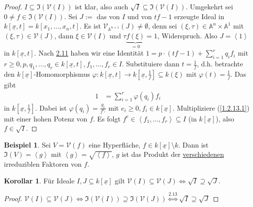\documentclass[
twoside=semi,
fontsize=12,
DIV=12, 
cleardoublepage=current,
leqno,
headings=optiontoheadandtoc, 
toc=idx
]{scrbook}
\newcommand{\A}{\mathbb{A}}
\newcommand{\V}{\mathcal{V}}
\newcommand{\x}{\underline{x}}
\newcommand{\I}{\mathfrak{I}}
\newcommand{\bracC}[1]{\left< #1 \right>}
\newcommand{\emphasize}[1]{\underline{#1}}
\theoremstyle{definition}
\newtheorem{beispiel}[definition]{Beispiel}
\newtheorem{korollar}[definition]{Korollar}
\begin{document}
	\begin{proof}
		$I \subseteq \I(\V(I))$ ist klar, also auch $\sqrt{I} \subseteq \I(\V(I))$. Umgekehrt sei $0 \neq f \in \I(\V(I))$. Sei $J:= $ das von $I$ und von $tf-1$ erzeugte Ideal in $k[\x, t] = k[x_1, \dots, x_n, t]$. Es ist $\V_{\A^{n+1}}(J) \neq \emptyset$, denn sei $(\xi, \tau) \in \A^n\times \A^1$ mit $(\xi, \tau) \in \V(J)$, dann $\xi \in \V(I)$ und $\tau \underbrace{f(\xi)}_{=0} = 1$, Widerspruch. Also $J =\bracC{1}$ in $k[\x, t]$. 
		\newline 
		Nach \hyperref[1.2.11]{2.11} haben wir eine Identit\"at $1 = p \cdot (tf-1) + \sum_{i=1}^{r}q_if_i$ mit $r\geq 0, p, q_1, \dots, q_r \in k[\x, t], f_1, \dots, f_r \in I$. Substituiere dann $t = \frac{1}{f}$, d.h. betrachte den $k[\x]$-Homomorphismus $\varphi: k[\x, t] \to k[\x, \frac{1}{f}] \subseteq k(\xi)$ mit $\varphi(t) = \frac{1}{f}$. Das gibt 
		\begin{align}
			1 &= \sum_{i=1}^r\varphi(q_i)f_i \tag{$*$}\label{1.2.13.1}
		\end{align}
		in $k[\x, \frac{1}{f}]$. Dabei ist $\varphi(q_i) = \frac{g_i}{f^{e_i}}$ mit $e_i \geq 0, f_i \in k[\x]$. Multipliziere (\ref{1.2.13.1}) mit einer hohen Potenz von $f$. Es folgt $f^e \in \bracC{f_1, \dots, f_r} \subseteq I$ (in $k[\x]$), also $f \in \sqrt{I}$.
	\end{proof}

	\begin{beispiel}\label{1.2.14}\hfill\newline
		Sei $V = \V(f)$ eine Hyperfl\"ache, $f \in k[\x]\setminus k$. Dann ist $\I(V) = \bracC{g}$ mit $\bracC{g} = \sqrt{\bracC{f}}$, $g$ ist das Produkt der \emphasize{verschiedenen}
		irreduziblen Faktoren von $f$.
	\end{beispiel}

	\begin{korollar}\label{1.2.15}\hfill\newline
		F\"ur Ideale $I, J \subseteq k[\x]$ gilt $\V(I) \subseteq \V(J) \iff \sqrt{I} \supseteq \sqrt{J}$.
	\end{korollar}

	\begin{proof}
		$\V(I) \subseteq \V(J) \iff \I(\V(I)) \supseteq \I(\V(J)) \overset{\hyperref[1.2.13]{2.13}}{\iff} \sqrt{I} \supseteq \sqrt{J}$
	\end{proof}
\end{document}
